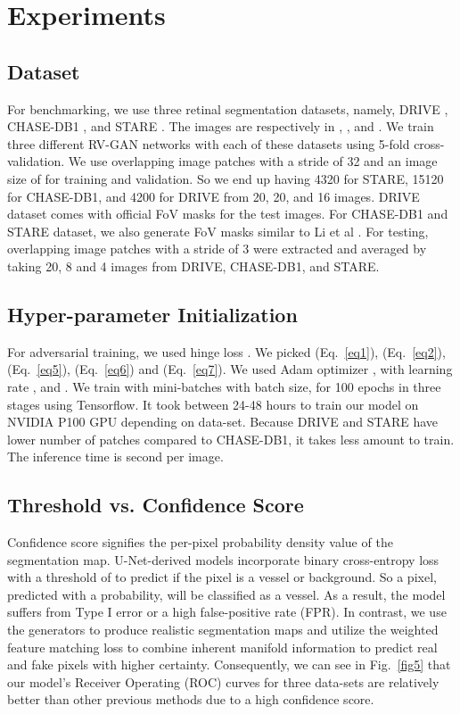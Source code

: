 \documentclass[runningheads]{llncs}
\begin{document}
\section{Experiments}
\subsection{Dataset}
\label{subsec:dataset}
For benchmarking, we use three retinal segmentation datasets, namely,  DRIVE  \cite{staal2004ridge}, CHASE-DB1 \cite{owen2009measuring},  and  STARE \cite{hoover2000locating}.  The images are respectively in , , and . We train three different RV-GAN networks with each of these datasets using 5-fold cross-validation.  We use overlapping image patches with a stride of 32 and an image size of  for training and validation. So we end up having 4320 for STARE,  15120 for CHASE-DB1, and 4200 for DRIVE from 20, 20, and 16 images.  DRIVE dataset comes with official FoV masks for the test images.  For CHASE-DB1 and STARE dataset, we also generate FoV masks similar to Li et al \cite{li2020iternet}.  For testing,  overlapping image patches with a stride of 3 were extracted and averaged by taking 20, 8 and 4 images from DRIVE, CHASE-DB1, and STARE. 


\subsection{Hyper-parameter Initialization}
\label{subsec:hyper}
For adversarial training, we used hinge loss \cite{zhang2019self,lim2017geometric}. We picked  (Eq.~\ref{eq1}),  (Eq.~\ref{eq2}),  (Eq.~\ref{eq5}),  (Eq.~\ref{eq6}) and  (Eq.~\ref{eq7}). We used Adam optimizer \cite{kingma2014adam}, with learning rate ,  and . We train with mini-batches with batch size,  for 100 epochs in three stages using Tensorflow. It took between 24-48 hours to train our model on NVIDIA P100 GPU depending on data-set. Because DRIVE and STARE have lower number of patches compared to CHASE-DB1, it takes less amount to train. The inference time is  second per image.
\subsection{Threshold vs. Confidence Score}
Confidence score signifies the per-pixel probability density value of the segmentation map. U-Net-derived models incorporate binary cross-entropy loss with a threshold of  to predict if the pixel is a vessel or background. So a pixel, predicted with a  probability, will be classified as a vessel. As a result, the model suffers from Type I error or a high false-positive rate (FPR). In contrast, we use the generators to produce realistic segmentation maps and utilize the weighted feature matching loss to combine inherent manifold information to predict real and fake pixels with higher certainty. Consequently, we can see in Fig.~\ref{fig5} that our model's Receiver Operating (ROC) curves for three data-sets are relatively better than other previous methods due to a high confidence score.
\end{document}
